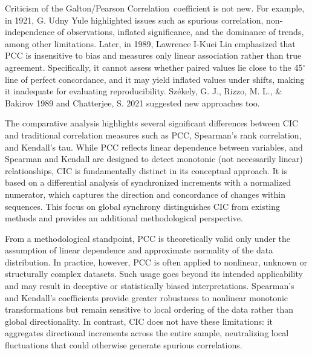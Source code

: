 \documentclass[aos]{imsart}
\newcommand{\cic}{\text{CIC}}
\newcommand{\pcc}{\text{PCC}}
\newcommand{\pccFull}{\textnormal{Galton/Pearson Correlation}}
\begin{document}
Criticism of the \pccFull\ coefficient is not new. For example, in 1921, G. Udny Yule \cite{r1} highlighted issues such as spurious correlation, non-independence of observations, inflated significance, and the dominance of trends, among other limitations. Later, in 1989, Lawrence I-Kuei Lin \cite{r2} emphasized that $\pcc$ is insensitive to bias and measures only linear association rather than true agreement. Specifically, it cannot assess whether paired values lie close to the 45$^\circ$ line of perfect concordance, and it may yield inflated values under shifts, making it inadequate for evaluating reproducibility. Sz\'ekely, G. J., Rizzo, M. L., \& Bakirov 1989 \cite{r4} and Chatterjee, S. 2021 \cite{r5} suggested new approaches too. 

The comparative analysis highlights several significant differences between $\cic$ and traditional correlation measures such as $\pcc$, Spearman’s rank correlation, and Kendall’s tau. While $\pcc$ reflects linear dependence between variables, and Spearman and Kendall are designed to detect monotonic (not necessarily linear) relationships, $\cic$ is fundamentally distinct in its conceptual approach. It is based on a differential analysis of synchronized increments with a normalized numerator, which captures the direction and concordance of changes within sequences. This focus on global synchrony distinguishes $\cic$ from existing methods and provides an additional methodological perspective.

From a methodological standpoint, $\pcc$ is theoretically valid only under the assumption of linear dependence and approximate normality of the data distribution. In practice, however, $\pcc$ is often applied to nonlinear, unknown or structurally complex datasets. Such usage goes beyond its intended applicability and may result in deceptive or statistically biased interpretations. Spearman’s and Kendall’s coefficients provide greater robustness to nonlinear monotonic transformations but remain sensitive to local ordering of the data rather than global directionality. In contrast, $\cic$ does not have these limitations: it aggregates directional increments across the entire sample, neutralizing local fluctuations that could otherwise generate spurious correlations.
\end{document}
